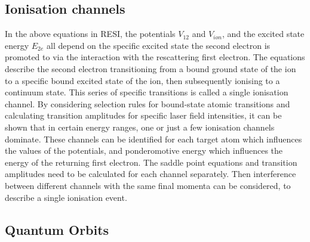 \documentclass[11pt]{article}
\numberwithin{equation}{section}
\begin{document}
\subsection{Ionisation channels}

In the above equations in RESI, the potentials $V_{12}$ and $V_{ion}$, and the excited state energy $E_{2e}$ all depend on the specific excited state the second electron is promoted to via the interaction with the rescattering first electron. The equations describe the second electron transitioning from a bound ground state of the ion to a specific bound excited state of the ion, then subsequently ionising to a continuum state. This series of specific transitions is called a single ionisation channel. By considering selection rules for bound-state atomic transitions and calculating transition amplitudes for specific laser field intensities, it can be shown that in certain energy ranges, one or just a few ionisation channels dominate. These channels can be identified for each target atom which influences the values of the potentials, and ponderomotive energy which influences the energy of the returning first electron. The saddle point equations and transition amplitudes need to be calculated for each channel separately. Then interference between different channels with the same final momenta can be considered, to describe a single ionisation event. 

\subsection{Quantum Orbits} \label{ch:SFAQO}
\end{document}
